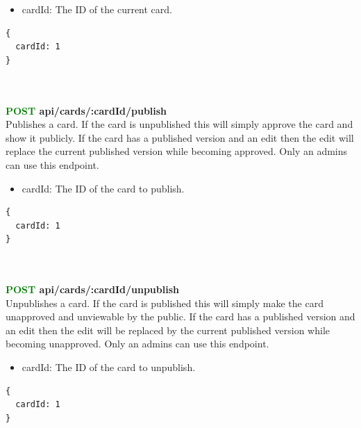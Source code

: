 \documentclass[onecolumn, draftclsnofoot,10pt, compsoc, usenames, dvipsnames]{IEEEtran}
\begin{document}
\begin{itemize}
  \item cardId: The ID of the current card.
\end{itemize}
\begin{lstlisting}[caption=Example Response]
{ 
  cardId: 1
}
\end{lstlisting}
\\~\\


\noindent
\textbf{\textcolor{Green}{POST} api/cards/:cardId/publish} \\
Publishes a card. If the card is unpublished this will simply approve the card and show it publicly. If the card has a published version and an edit then the edit will replace the current published version while becoming approved. Only an admins can use this endpoint.
\begin{itemize}
    \item cardId: The ID of the card to publish.
\end{itemize}
\begin{lstlisting}[caption=Example Response]
{ 
  cardId: 1
}
\end{lstlisting}
\\~\\


\noindent
\textbf{\textcolor{Green}{POST} api/cards/:cardId/unpublish} \\
Unpublishes a card. If the card is published this will simply make the card unapproved and unviewable by the public. If the card has a published version and an edit then the edit will  be replaced by the current published version while becoming unapproved. Only an admins can use this endpoint.
\begin{itemize}
    \item cardId: The ID of the card to unpublish.
\end{itemize}
\begin{lstlisting}[caption=Example Response]
{ 
  cardId: 1
}
\end{lstlisting}
\\~\\
\end{document}
